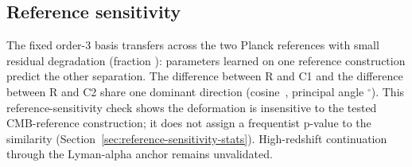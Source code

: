 \subsection{Reference sensitivity}

The fixed order-3 basis transfers across the two Planck references with small
residual degradation (fraction \GeometryTransferDegradation{}):
parameters learned on
one reference construction predict the other separation. The difference between R and C1 and the difference between R and C2
share one dominant direction
(cosine~\GeometryCosineSimilarity{}, principal angle
\GeometryPrincipalAngle$^{\circ}$). This reference-sensitivity
check shows the deformation is insensitive to the tested
CMB-reference construction; it does not assign a frequentist
p-value to the similarity (Section~\ref{sec:reference-sensitivity-stats}).
High-redshift continuation through the
Lyman-alpha anchor remains unvalidated.

